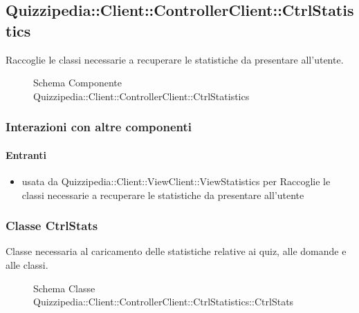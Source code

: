 \subsection{Quizzipedia::Client::ControllerClient::CtrlStatistics}
Raccoglie le classi necessarie a recuperare le statistiche da presentare all'utente.
\begin{figure}[H]
\centering
\noindent{}
\caption[Schema Componente Quizzipedia::Client::ControllerClient::CtrlStatistics]{Schema Componente Quizzipedia::Client::ControllerClient::CtrlStatistics}
\end{figure}
\subsubsection{Interazioni con altre componenti}
\paragraph{Entranti}
\begin{itemize}
\item usata da Quizzipedia::Client::ViewClient::ViewStatistics per Raccoglie le classi necessarie a recuperare le statistiche da presentare all'utente
\end{itemize}
\subsubsection{Classe CtrlStats}
Classe necessaria al caricamento delle statistiche relative ai quiz, alle domande e alle classi.
\begin{figure}[H]
\centering
\noindent{}
\caption[Schema Classe CtrlStats]{Schema Classe Quizzipedia::Client::ControllerClient::CtrlStatistics::CtrlStats}
\end{figure}
